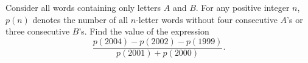 Consider all words containing only letters $A$ and $B$. For any positive integer $n$, $p(n)$ denotes the number of all $n$-letter words without four consecutive $A$'s or three consecutive $B$'s. Find the value of the expression
\[\frac{p(2004)-p(2002)-p(1999)}{p(2001)+p(2000)}.\]